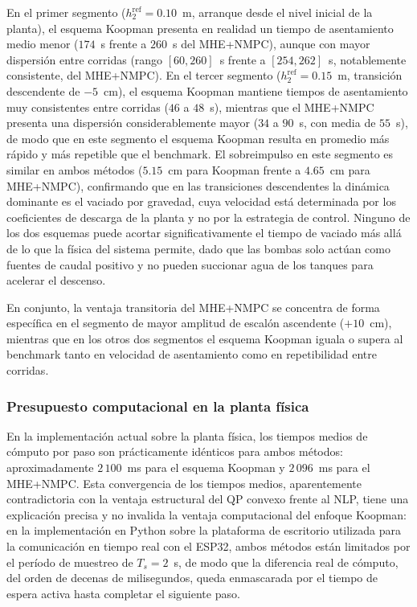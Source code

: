 \documentclass[12pt,letterpaper]{article}
\begin{document}
En el primer segmento ($h_2^{\mathrm{ref}} = 0.10$~m, arranque desde 
el nivel inicial de la planta), el esquema Koopman presenta en 
realidad un tiempo de asentamiento medio menor ($174$~s frente a 
$260$~s del MHE+NMPC), aunque con mayor dispersión entre corridas 
(rango $[60, 260]$~s frente a $[254, 262]$~s, notablemente 
consistente, del MHE+NMPC). En el tercer segmento 
($h_2^{\mathrm{ref}} = 0.15$~m, transición descendente de 
$-5$~cm), el esquema Koopman mantiene tiempos de asentamiento muy 
consistentes entre corridas ($46$ a $48$~s), mientras que el 
MHE+NMPC presenta una dispersión considerablemente mayor ($34$ a 
$90$~s, con media de $55$~s), de modo que en este segmento el 
esquema Koopman resulta en promedio más rápido y más repetible 
que el benchmark. El sobreimpulso en este segmento es similar en 
ambos métodos ($5.15$~cm para Koopman frente a $4.65$~cm para 
MHE+NMPC), confirmando que en las transiciones descendentes la 
dinámica dominante es el vaciado por gravedad, cuya velocidad está 
determinada por los coeficientes de descarga de la planta y no por 
la estrategia de control. Ninguno de los dos esquemas puede 
acortar significativamente el tiempo de vaciado más allá de lo 
que la física del sistema permite, dado que las bombas solo actúan 
como fuentes de caudal positivo y no pueden succionar agua de los 
tanques para acelerar el descenso.

En conjunto, la ventaja transitoria del MHE+NMPC se concentra de 
forma específica en el segmento de mayor amplitud de escalón 
ascendente ($+10$~cm), mientras que en los otros dos segmentos el 
esquema Koopman iguala o supera al benchmark tanto en velocidad 
de asentamiento como en repetibilidad entre corridas.

\subsubsection{Presupuesto computacional en la planta física}
\label{sec:analisis_exp_comp}

En la implementación actual sobre la planta física, los tiempos 
medios de cómputo por paso son prácticamente idénticos para ambos 
métodos: aproximadamente $2\,100$~ms para el esquema Koopman y 
$2\,096$~ms para el MHE+NMPC. Esta convergencia de los tiempos 
medios, aparentemente contradictoria con la ventaja estructural 
del QP convexo frente al NLP, tiene una explicación precisa y no 
invalida la ventaja computacional del enfoque Koopman: en la 
implementación en Python sobre la plataforma de escritorio 
utilizada para la comunicación en tiempo real con el ESP32, ambos 
métodos están limitados por el período de muestreo de $T_s = 2$~s, 
de modo que la diferencia real de cómputo, del orden de decenas
de milisegundos, queda enmascarada por el tiempo de espera
activa hasta completar el siguiente paso.
\end{document}
